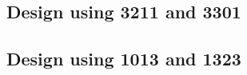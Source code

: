 \subsection{Design using 3211 and 3301}


 \begin{center}




 \end{center}



\subsection{Design using 1013 and 1323}


 \begin{center}




 \end{center}



